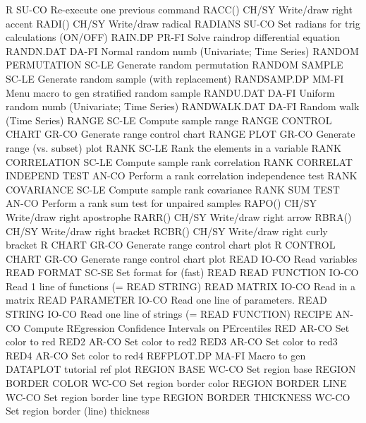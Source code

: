 R                           SU-CO Re-execute one previous command
RACC()                      CH/SY Write/draw right accent
RADI()                      CH/SY Write/draw radical
RADIANS                     SU-CO Set radians for trig calculations (ON/OFF)
RAIN.DP                     PR-FI Solve raindrop differential equation 
RANDN.DAT                   DA-FI Normal random numb (Univariate; Time Series)
RANDOM PERMUTATION          SC-LE Generate random permutation
RANDOM SAMPLE               SC-LE Generate random sample (with replacement)
RANDSAMP.DP                 MM-FI Menu macro to gen stratified random sample
RANDU.DAT                   DA-FI Uniform random numb (Univariate; Time Series)
RANDWALK.DAT                DA-FI Random walk (Time Series)
RANGE                       SC-LE Compute sample range
RANGE CONTROL CHART         GR-CO Generate range control chart
RANGE PLOT                  GR-CO Generate range (vs. subset) plot
RANK                        SC-LE Rank the elements in a variable
RANK CORRELATION            SC-LE Compute sample rank correlation
RANK CORRELAT INDEPEND TEST AN-CO Perform a rank correlation independence test
RANK COVARIANCE             SC-LE Compute sample rank covariance
RANK SUM TEST               AN-CO Perform a rank sum test for unpaired samples
RAPO()                      CH/SY Write/draw right apostrophe
RARR()                      CH/SY Write/draw right arrow
RBRA()                      CH/SY Write/draw right bracket
RCBR()                      CH/SY Write/draw right curly bracket
R CHART                     GR-CO Generate range control chart plot
R CONTROL CHART             GR-CO Generate range control chart plot
READ                        IO-CO Read variables
READ FORMAT                 SC-SE Set format for (fast) READ
READ FUNCTION               IO-CO Read 1 line of functions (= READ STRING)
READ MATRIX                 IO-CO Read in a matrix
READ PARAMETER              IO-CO Read one line of parameters.
READ STRING                 IO-CO Read one line of strings (= READ FUNCTION)
RECIPE                      AN-CO Compute REgression Confidence Intervals on PErcentiles
RED                         AR-CO Set color to red
RED2                        AR-CO Set color to red2
RED3                        AR-CO Set color to red3
RED4                        AR-CO Set color to red4
REFPLOT.DP                  MA-FI Macro to gen DATAPLOT tutorial ref plot
REGION BASE                 WC-CO Set region base
REGION BORDER COLOR         WC-CO Set region border color
REGION BORDER LINE          WC-CO Set region border line type
REGION BORDER THICKNESS     WC-CO Set region border (line) thickness
